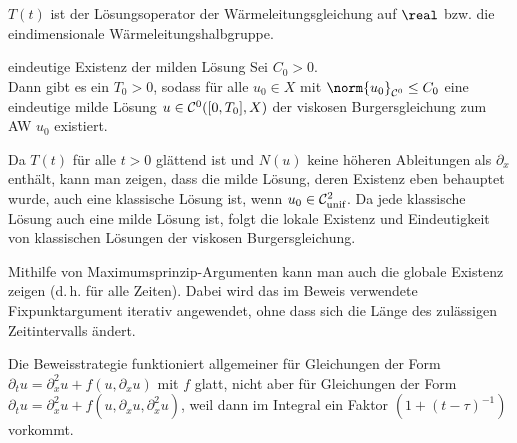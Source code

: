 \begin{Bem}
    $T(t)$ ist der Lösungsoperator der Wärmeleitungsgleichung auf $\real$ bzw.
    die eindimensionale Wärmeleitungshalbgruppe.
\end{Bem}

\linie

\begin{Satz}{eindeutige Existenz der milden Lösung}
    Sei $C_0 > 0$.\\
    Dann gibt es ein $T_0 > 0$, sodass für alle $u_0 \in X$ mit $\norm{u_0}_{\C^0} \le C_0$
    eine eindeutige milde Lösung $u \in \mathcal{C}^0([0, T_0], X)$ der viskosen
    Burgersgleichung zum AW $u_0$ existiert.
\end{Satz}

\begin{Bem}
    Da $T(t)$ für alle $t > 0$ glättend ist und $N(u)$ keine höheren Ableitungen als $\partial_x$
    enthält, kann man zeigen, dass die milde Lösung, deren Existenz eben behauptet wurde,
    auch eine klassische Lösung ist, wenn $u_0 \in \mathcal{C}^2_{\text{unif}}$.
    Da jede klassische Lösung auch eine milde Lösung ist, folgt die lokale Existenz und
    Eindeutigkeit von klassischen Lösungen der viskosen Burgersgleichung.
    
    Mithilfe von Maximumsprinzip-Argumenten kann man auch die globale Existenz zeigen
    (d.\,h. für alle Zeiten).
    Dabei wird das im Beweis verwendete Fixpunktargument iterativ angewendet, ohne dass sich
    die Länge des zulässigen Zeitintervalls ändert.
    
    Die Beweisstrategie funktioniert allgemeiner für Gleichungen der Form
    $\partial_t u = \partial_x^2 u + f(u, \partial_x u)$ mit $f$ glatt, nicht aber für Gleichungen
    der Form $\partial_t u = \partial_x^2 u + f(u, \partial_x u, \partial_x^2 u)$, weil dann im
    Integral ein Faktor $(1 + (t - \tau)^{-1})$ vorkommt.
\end{Bem}

\pagebreak
